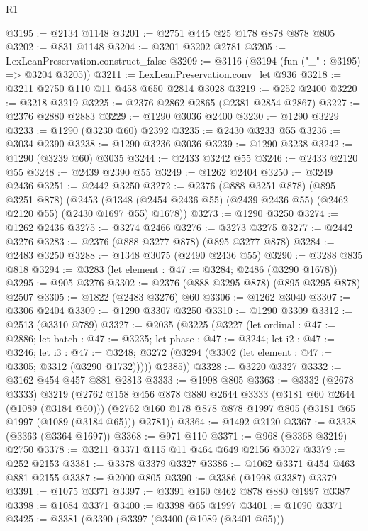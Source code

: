 \begin{lexlean}{R1}
\begin{coremodule}
@3195 := @2134 @1148
@3201 := @2751 @445 @25 @178 @878 @878 @805
@3202 := @831 @1148
@3204 := @3201 @3202 @2781
@3205 := LexLeanPreservation.construct_false
@3209 := @3116 (@3194 (fun ("_" : @3195) => @3204 @3205))
@3211 := LexLeanPreservation.conv_let @936
@3218 := @3211 @2750 @110 @11 @458 @650 @2814 @3028
@3219 := @252 @2400
@3220 := @3218 @3219
@3225 := @2376 @2862 @2865 (@2381 @2854 @2867)
@3227 := @2376 @2880 @2883
@3229 := @1290 @3036 @2400
@3230 := @1290 @3229
@3233 := @1290 (@3230 @60) @2392
@3235 := @2430 @3233 @55
@3236 := @3034 @2390
@3238 := @1290 @3236 @3036
@3239 := @1290 @3238
@3242 := @1290 (@3239 @60) @3035
@3244 := @2433 @3242 @55
@3246 := @2433 @2120 @55
@3248 := @2439 @2390 @55
@3249 := @1262 @2404
@3250 := @3249 @2436
@3251 := @2442 @3250
@3272 := @2376
    (@888 @3251 @878)
    (@895 @3251 @878)
    (@2453 (@1348 (@2454 @2436 @55) (@2439 @2436 @55) (@2462 @2120 @55) (@2430 @1697 @55) @1678))
@3273 := @1290 @3250
@3274 := @1262 @2436
@3275 := @3274 @2466
@3276 := @3273 @3275
@3277 := @2442 @3276
@3283 := @2376 (@888 @3277 @878) (@895 @3277 @878)
@3284 := @2483 @3250
@3288 := @1348 @3075 (@2490 @2436 @55)
@3290 := @3288 @835 @818
@3294 := @3283 (let element : @47 := @3284; @2486 (@3290 @1678))
@3295 := @905 @3276
@3302 := @2376 (@888 @3295 @878) (@895 @3295 @878) @2507
@3305 := @1822 (@2483 @3276) @60
@3306 := @1262 @3040
@3307 := @3306 @2404
@3309 := @1290 @3307 @3250
@3310 := @1290 @3309
@3312 := @2513 (@3310 @789)
@3327 := @2035
    (@3225
      (@3227
        (let ordinal : @47 := @2886;
        let batch : @47 := @3235;
        let phase : @47 := @3244;
        let i2 : @47 := @3246;
        let i3 : @47 := @3248;
        @3272 (@3294 (@3302 (let element : @47 := @3305; @3312 (@3290 @1732)))))
        @2385))
@3328 := @3220 @3327
@3332 := @3162 @454 @457 @881 @2813
@3333 := @1998 @805
@3363 := @3332
    (@2678 @3333)
    @3219
    (@2762
      @158
      @456
      @878
      @880
      @2644
      @3333
      (@3181 @60 @2644 (@1089 (@3184 @60)))
      (@2762 @160 @178 @878 @878 @1997 @805 (@3181 @65 @1997 (@1089 (@3184 @65))) @2781))
@3364 := @1492 @2120
@3367 := @3328 (@3363 (@3364 @1697))
@3368 := @971 @110
@3371 := @968 (@3368 @3219) @2750
@3378 := @3211 @3371 @115 @11 @464 @649 @2156 @3027
@3379 := @252 @2153
@3381 := @3378 @3379 @3327
@3386 := @1062 @3371 @454 @463 @881 @2155
@3387 := @2000 @805
@3390 := @3386 (@1998 @3387) @3379
@3391 := @1075 @3371
@3397 := @3391 @160 @462 @878 @880 @1997 @3387
@3398 := @1084 @3371
@3400 := @3398 @65 @1997
@3401 := @1090 @3371
@3425 := @3381
    (@3390
      (@3397
        (@3400 (@1089 (@3401 @65)))

\end{coremodule}
\end{lexlean}
